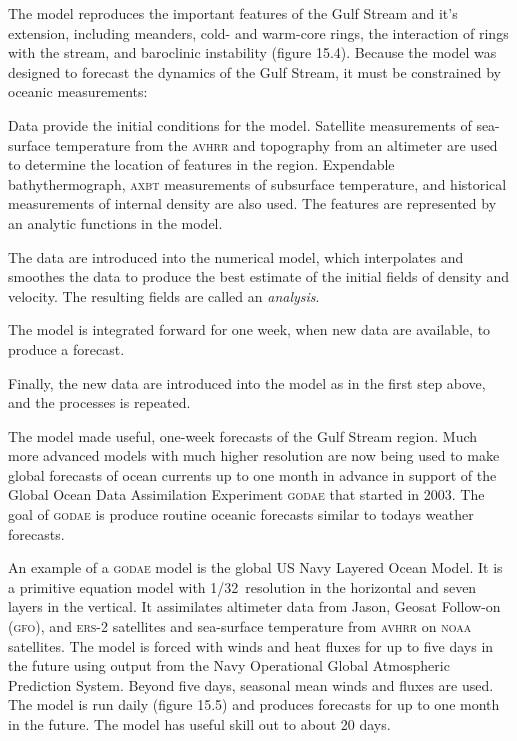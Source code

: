 The model reproduces the important features of the Gulf Stream and it's extension, including meanders, cold- and warm-core rings, the interaction of
rings with the stream, and baroclinic instability (figure 15.4). Because the model was designed
to forecast the dynamics of the Gulf Stream, it must be constrained by oceanic
measurements:
\begin{enumerate}
\vitem Data provide the initial conditions for the model. Satellite measurements
of sea-surface temperature from the \textsc{avhrr} and topography from an
altimeter are used to determine the location of features in the region.
Expendable bathythermograph, \textsc{axbt} measurements of subsurface temperature,
and historical measurements of internal density are also used. The
features are represented by an analytic functions in the model.

\vitem The data are introduced into the numerical model, which interpolates and
smoothes the data to produce the best estimate of the initial fields of
density and velocity. The resulting fields are called an \textit{analysis}.

\vitem The model is integrated forward for one week, when new data are available,
to produce a forecast.

\vitem Finally, the new data are introduced into the model as in the first step
above, and the processes is repeated.
\end{enumerate}
The model made useful, one-week forecasts of the Gulf
Stream region. Much more advanced models with much higher resolution are now being used to make global forecasts of ocean currents up to one month in advance in support of the Global Ocean Data Assimilation Experiment
\textsc{godae}  that started in
2003. The goal of \textsc{godae} is produce routine oceanic forecasts similar to todays weather
forecasts. 

An example of a \textsc{godae} model is the global US Navy Layered Ocean
Model. It is a primitive equation model with
1/32\degrees\ resolution in the horizontal and seven layers in the vertical. It assimilates
altimeter data from Jason, Geosat Follow-on
(\textsc{gfo}), and
\textsc{ers}-2 satellites and sea-surface temperature from
\textsc{avhrr} on \textsc{noaa} satellites. The model is forced with winds and heat
fluxes for up to five days in the future using output from the Navy Operational Global
Atmospheric Prediction System. Beyond five days, seasonal mean winds and fluxes are used. The
model is run daily (figure 15.5) and produces forecasts for up to one month in the future. The
model has useful skill out to about 20 days.

